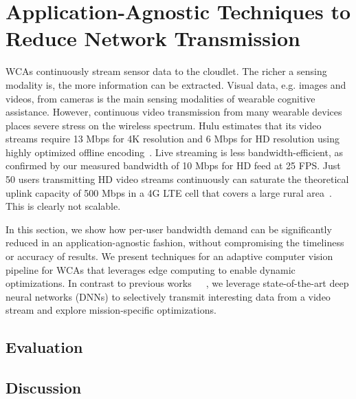 \chapter{Application-Agnostic Techniques to Reduce Network Transmission}
\label{chapter: bandwidth}

WCAs continuously stream sensor data to the cloudlet. The richer a sensing
modality is, the more information can be extracted. Visual data, e.g. images and
videos, from cameras is the main sensing modalities of wearable cognitive
assistance. However, continuous video transmission from many wearable devices
places severe stress on the wireless spectrum.  Hulu estimates that its video
streams require 13 Mbps for 4K resolution and 6 Mbps for HD resolution using
highly optimized offline encoding~\cite{Hulu2017}. Live streaming is less
bandwidth-efficient, as confirmed by our measured bandwidth of 10 Mbps for HD
feed at 25 FPS. Just 50 users transmitting HD video streams continuously can
saturate the theoretical uplink capacity of 500 Mbps in a 4G LTE cell that
covers a large rural area~\cite{LteWorld2009}.  This is clearly not scalable.

In this section, we show how per-user bandwidth demand can be significantly
reduced in an application-agnostic fashion, without compromising the timeliness
or accuracy of results. We present techniques for an adaptive computer vision
pipeline for WCAs that leverages edge computing to enable dynamic optimizations.
In contrast to previous
works~\cite{Wang2017networked}~\cite{zhang2015design}~\cite{Wang2016skyeyes}, we
leverage state-of-the-art deep neural networks (DNNs) to selectively transmit
interesting data from a video stream and explore mission-specific optimizations.





\section{Evaluation}
\section{Discussion}